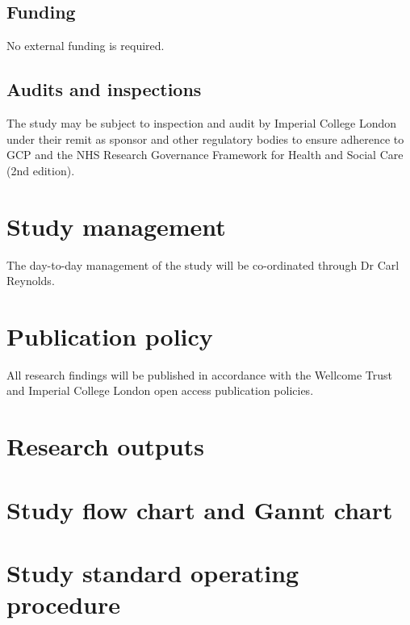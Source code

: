 \documentclass[a4paper,10pt]{article}
\begin{document}
\subsection{Funding}
No external funding is required.

\subsection{Audits and inspections}
The study may be subject to inspection and audit by Imperial College London under their remit as sponsor and other regulatory bodies to ensure adherence to GCP and the NHS Research Governance Framework for Health and Social Care (2nd edition). 

\section{Study management}
The day-to-day management of the study will be co-ordinated through Dr Carl Reynolds.

\section{Publication policy}
All research findings will be published in accordance with the Wellcome Trust and Imperial College London open access publication policies.


\begin{appendices}

\section{Research outputs}


\section{Study flow chart and Gannt chart}




\section{Study standard operating procedure}


\end{appendices}
     
\makeatletter
 \def\@biblabel#1{#1}
\makeatother



\end{document}
